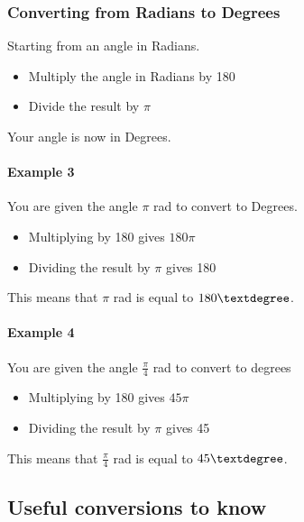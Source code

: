 \documentclass[
  12pt,
  a4paper, oneside]{starmastarticle}
\let\oldparagraph\paragraph
\renewcommand{\paragraph}[1]{\oldparagraph{#1}\mbox{}}
\providecommand{\tightlist}{%
  \setlength{\itemsep}{0pt}\setlength{\parskip}{0pt}}\usepackage{longtable,booktabs,array}
\begin{document}
\hypertarget{converting-from-radians-to-degrees}{%
\subsubsection{Converting from Radians to
Degrees}\label{converting-from-radians-to-degrees}}

Starting from an angle in Radians.

\begin{itemize}
\tightlist
\item
  Multiply the angle in Radians by 180
\item
  Divide the result by \(\pi\)
\end{itemize}

Your angle is now in Degrees.

\hypertarget{example-3}{%
\paragraph{Example 3}\label{example-3}}

You are given the angle \(\pi\) rad to convert to Degrees.

\begin{itemize}
\tightlist
\item
  Multiplying by 180 gives \(180\pi\)
\item
  Dividing the result by \(\pi\) gives 180
\end{itemize}

This means that \(\pi\) rad is equal to \(180\textdegree\).

\hypertarget{example-4}{%
\paragraph{Example 4}\label{example-4}}

You are given the angle \(\frac{\pi}{4}\) rad to convert to degrees

\begin{itemize}
\tightlist
\item
  Multiplying by 180 gives \(45\pi\)
\item
  Dividing the result by \(\pi\) gives 45
\end{itemize}

This means that \(\frac{\pi}{4}\) rad is equal to \(45\textdegree\).

\hypertarget{useful-conversions-to-know}{%
\subsection*{Useful conversions to
know}\label{useful-conversions-to-know}}
\end{document}
